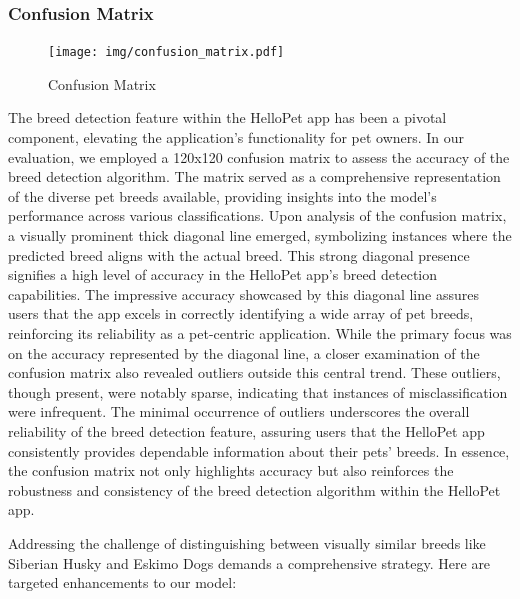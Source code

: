 \subsubsection{Confusion Matrix}
\vspace{0.7cm}
\begin{figure}[H]
\centering
\texttt{[image: img/confusion\_matrix.pdf]}
\caption{Confusion Matrix}
\label{fig:system-overview}
\end{figure}
The breed detection feature within the HelloPet app has been a pivotal component, elevating the application's functionality for pet owners. In our evaluation, we employed a 120x120 confusion matrix to assess the accuracy of the breed detection algorithm. The matrix served as a comprehensive representation of the diverse pet breeds available, providing insights into the model's performance across various classifications. Upon analysis of the confusion matrix, a visually prominent thick diagonal line emerged, symbolizing instances where the predicted breed aligns with the actual breed. This strong diagonal presence signifies a high level of accuracy in the HelloPet app's breed detection capabilities. The impressive accuracy showcased by this diagonal line assures users that the app excels in correctly identifying a wide array of pet breeds, reinforcing its reliability as a pet-centric application. While the primary focus was on the accuracy represented by the diagonal line, a closer examination of the confusion matrix also revealed outliers outside this central trend. These outliers, though present, were notably sparse, indicating that instances of misclassification were infrequent. The minimal occurrence of outliers underscores the overall reliability of the breed detection feature, assuring users that the HelloPet app consistently provides dependable information about their pets' breeds. In essence, the confusion matrix not only highlights accuracy but also reinforces the robustness and consistency of the breed detection algorithm within the HelloPet app.

Addressing the challenge of distinguishing between visually similar breeds like Siberian Husky and Eskimo Dogs demands a comprehensive strategy. Here are targeted enhancements to our model:

